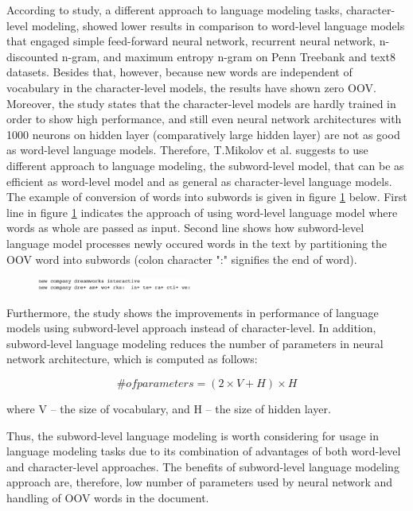 \documentclass{IEEEtran}
\begin{document}
According to \cite{Mikolov2011SubwordLM} study, a different approach to language modeling tasks, character-level modeling, showed lower results in comparison to word-level language models that engaged simple feed-forward neural network, recurrent neural network, n-discounted n-gram, and maximum entropy n-gram on Penn Treebank and text8 datasets. Besides that, however, because new words are independent of vocabulary in the character-level models, the results have shown zero OOV. Moreover, the study \cite{Mikolov2011SubwordLM} states that the character-level models are hardly trained in order to show high performance, and still even neural network architectures with 1000 neurons on hidden layer (comparatively large hidden layer) are not as good as word-level language models. Therefore, T.Mikolov et al. suggests to use different approach to language modeling, the subword-level model, that can be as efficient as word-level model and as general as character-level language models. The example of conversion of words into subwords is given in figure \ref{fig:subword} below. First line in figure \ref{fig:subword} indicates the approach of using word-level language model where words as whole are passed as input. Second line shows how subword-level language model processes newly occured words in the text by partitioning the OOV word into subwords (colon character ":" signifies the end of word). 

\begin{figure}[h]
	\centering
	\includegraphics[width=0.45\textwidth]{subword}
	\label{fig:subword}
\end{figure}

Furthermore, the \cite{Mikolov2011SubwordLM} study shows the improvements in performance of language models using subword-level approach instead of character-level. In addition, subword-level language modeling reduces the number of parameters in neural network architecture, which is computed as follows:

\begin{equation}
	\# of parameters = (2 \times V + H) \times H
\end{equation}

where V -- the size of vocabulary, and H -- the size of hidden layer.

Thus, the subword-level language modeling is worth considering for usage in language modeling tasks due to its combination of advantages of both word-level and character-level approaches. The benefits of subword-level language modeling approach are, therefore, low number of parameters used by neural network and handling of OOV words in the document.
\end{document}
